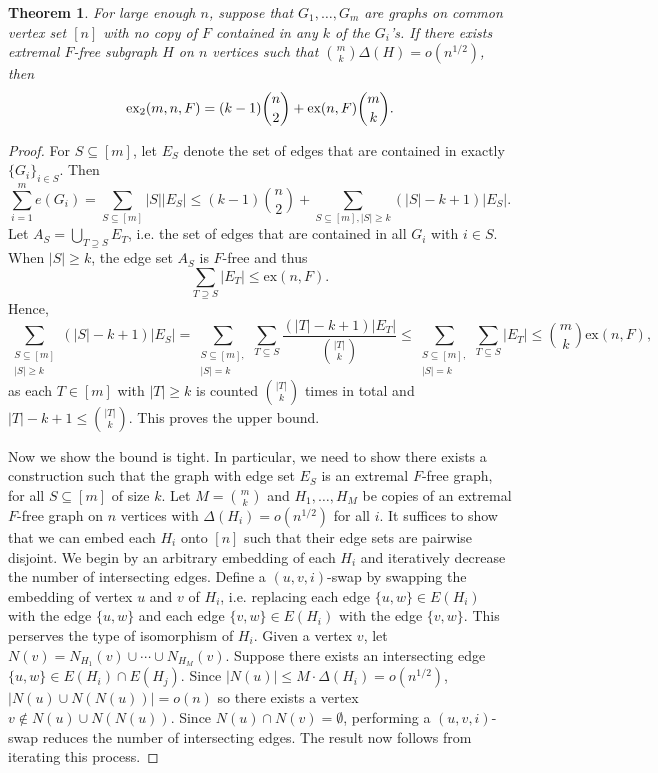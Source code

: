 \documentclass[12pt]{report}
\newtheorem{theorem}{Theorem}[chapter]
\newcommand*{\ex}{\textnormal{ex}}
\newcommand*{\dex}{\textnormal{ex}_2}
\begin{document}
\begin{theorem}
  For large enough $n$, suppose that $G_1, \ldots, G_m$ are graphs on common vertex set $[n]$ with no copy of $F$ contained in any $k$ of the $G_i$'s. If there exists extremal $F$-free subgraph $H$ on $n$ vertices such that $\binom{m}{k}\Delta(H) = o(n^{1/2})$, then
  \[
    \dex(m, n ,F) = (k - 1)\binom{n}{2} + \ex(n, F)\binom{m}{k}.
  \]
\end{theorem}

\begin{proof}
  For $S \subseteq [m]$, let $E_S$ denote the set of edges that are contained in exactly $\{G_i\}_{i \in S}$. Then 
  \[
    \sum_{i = 1}^m e(G_i) = \sum_{S \subseteq [m]} |S||E_S| \leq (k - 1)\binom{n}{2} + \sum_{S \subseteq [m], |S| \geq k} (|S| - k + 1)|E_S|.
  \]
  Let $A_S = \bigcup_{T \supseteq S} E_T$, i.e. the set of edges that are contained in all $G_i$ with $i \in S$. When $|S| \geq k$, the edge set $A_S$ is $F$-free and thus 
  \[
    \sum_{T \supseteq S} |E_T| \leq \text{ex}(n, F).
  \]
  Hence,
  \[
    \sum_{\substack{S \subseteq [m] \\ |S| \geq k}} (|S| - k + 1)|E_S| = \sum_{\substack{S \subseteq [m], \\ |S| = k}} \sum_{T \subseteq S} \frac{(|T| - k + 1)|E_T|}{\binom{|T|}{k}} \leq \sum_{\substack{S \subseteq [m], \\ |S| = k}} \sum_{T \subseteq S} |E_T| \leq \binom{m}{k}\text{ex}(n, F),
  \]
  as each $T \in [m]$ with $|T| \geq k$ is counted $\binom{|T|}{k}$ times in total and $|T| - k + 1 \leq \binom{|T|}{k}$. This proves the upper bound.

  Now we show the bound is tight. In particular, we need to show there exists a construction such that the graph with edge set $E_S$ is an extremal $F$-free graph, for all $S \subseteq [m]$ of size $k$. Let $M = \binom{m}{k}$ and $H_1, \ldots, H_M$ be copies of an extremal $F$-free graph on $n$ vertices with $\Delta(H_i) = o(n^{1/2})$ for all $i$. It suffices to show that we can embed each $H_i$ onto $[n]$ such that their edge sets are pairwise disjoint. We begin by an arbitrary embedding of each $H_i$ and iteratively decrease the number of intersecting edges. Define a $(u, v, i)$-swap by swapping the embedding of vertex $u$ and $v$ of $H_i$, i.e. replacing each edge $\{u, w\} \in E(H_i)$ with the edge $\{u, w\}$ and each edge $\{v, w\} \in E(H_i)$ with the edge $\{v, w\}$. This perserves the type of isomorphism of $H_i$. Given a vertex $v$, let $N(v) = N_{H_1}(v) \cup \cdots \cup N_{H_M}(v)$. Suppose there exists an intersecting edge $\{u, w\} \in E(H_i) \cap E(H_j)$. Since $|N(u)|
  \leq M \cdot \Delta(H_i) = o(n^{1/2})$, $|N(u) \cup N(N(u))| = o(n)$ so there exists a vertex $v \notin N(u) \cup N(N(u))$. Since $N(u) \cap N(v) = \emptyset$, performing a $(u, v, i)$-swap reduces the number of intersecting edges. The result now follows from iterating this process.
\end{proof}
\end{document}
